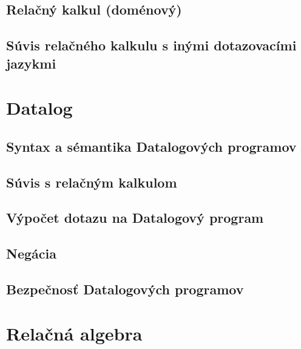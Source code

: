 \documentclass[10pt,a4paper]{article}
\begin{document}
\subsection{Relačný kalkul (doménový)}

\subsection{Súvis relačného kalkulu s inými dotazovacími jazykmi}
    
\section{Datalog}

\subsection{Syntax a sémantika Datalogových programov}

\subsection{Súvis s relačným kalkulom}

\subsection{Výpočet dotazu na Datalogový program}

\subsection{Negácia}

\subsection{Bezpečnosť Datalogových programov}
    
\section{Relačná algebra}
\end{document}
